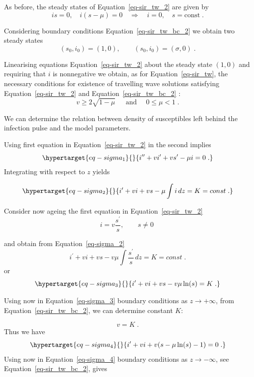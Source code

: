 \documentclass[
  letterpaper,
  DIV=11,
  numbers=noendperiod]{scrreprt}
\theoremstyle{plain}
\theoremstyle{definition}
\theoremstyle{plain}
\theoremstyle{remark}
\begin{document}
As before, the steady states of Equation~\ref{eq-sir_tw_2} are given by
\[
 is =0 , \quad i ( s- \mu) = 0  \quad \Longrightarrow \quad  i=0, \quad s = \text{const} \; .
\]

Considering boundary conditions Equation~\ref{eq-sir_tw_bc_2} we obtain
two steady states \[
(s_0, i_0) = ( 1, 0), \qquad (s_0, i_0) = (\sigma, 0) \; .
\]

Linearising equations Equation~\ref{eq-sir_tw_2} about the steady state
\((1,0)\) and requiring that \(i\) is nonnegative we obtain, as for
Equation~\ref{eq-sir_tw}, the necessary conditions for existence of
travelling wave solutions satisfying Equation~\ref{eq-sir_tw_2} and
Equation~\ref{eq-sir_tw_bc_2} : \[
 v \geq 2 \sqrt{ 1- \mu} \, \quad \text{ and } \quad 0 \leq \mu < 1\; .  
\]

We can determine the relation between density of susceptibles left
behind the infection pulse and the model parameters.

Using first equation in Equation~\ref{eq-sir_tw_2} in the second implies
\begin{equation}\protect\hypertarget{eq-sigma_1}{}{
 i^{\prime \prime} + v i^\prime + v s^\prime  - \mu i= 0\; .
}\label{eq-sigma_1}\end{equation} Integrating with respect to \(z\)
yields

\begin{equation}\protect\hypertarget{eq-sigma_2}{}{
 i^{\prime } + v i + v s  - \mu \int i\, dz = K= const\; .
}\label{eq-sigma_2}\end{equation}

Consider now ageing the first equation in Equation~\ref{eq-sir_tw_2} \[
i= v \frac {s^\prime} s, \quad \quad s \neq 0 \; 
\]

and obtain from Equation~\ref{eq-sigma_2} \[
 i^{\prime } + v i + v s  - v  \mu \int   \frac {s^\prime} s\, dz = K= const\; .
\] or \begin{equation}\protect\hypertarget{eq-sigma_3}{}{
 i^{\prime } + v i + v s  - v  \mu \ln(s) = K\; .
}\label{eq-sigma_3}\end{equation}

Using now in Equation~\ref{eq-sigma_3} boundary conditions as
\(z \to + \infty\), from Equation~\ref{eq-sir_tw_bc_2}, we can determine
constant \(K\):

\[
 v    = K\; .
\] Thus we have \begin{equation}\protect\hypertarget{eq-sigma_4}{}{
 i^{\prime } + v i + v( s  - \mu \ln(s) -1)= 0\; .
}\label{eq-sigma_4}\end{equation} Using now in Equation~\ref{eq-sigma_4}
boundary conditions as \(z \to - \infty\), see
Equation~\ref{eq-sir_tw_bc_2}, gives
\end{document}
